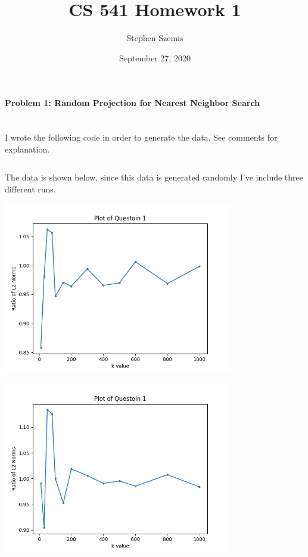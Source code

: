 \documentclass[12pt]{article}
\begin{document}
    \title{CS 541 Homework 1}
    \author{Stephen Szemis}
    \date{September 27, 2020}
    \maketitle

    \paragraph{Problem 1: Random Projection for Nearest Neighbor Search} ~\\
    I wrote the following code in order to generate the data. See comments for
    explanation.
    \inputminted{python}{hw1.py}

    The data is shown below, since this data is generated randomly I've include 
    three different runs.
    \begin{center}
        

    \includegraphics[width=10cm]{Figure_1.png}


    \includegraphics[width=10cm]{Figure_2.png}



\end{center}
\end{document}
